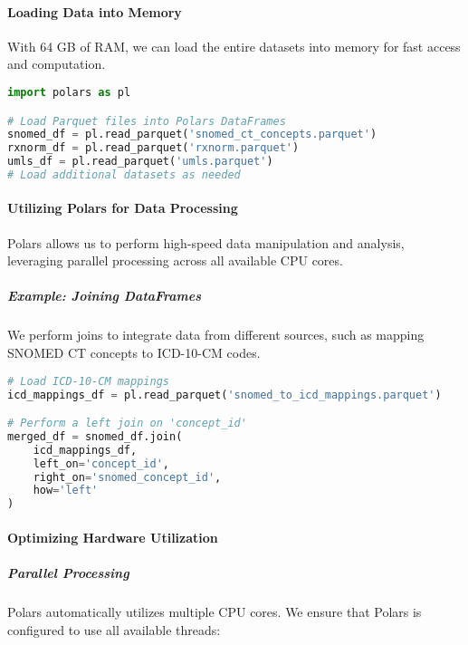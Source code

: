 \documentclass[12pt, a4paper]{article}
\begin{document}
\paragraph{Loading Data into Memory}

With 64 GB of RAM, we can load the entire datasets into memory for fast access and computation.

\begin{lstlisting}[language=Python, caption=Loading Parquet files into Polars DataFrames, label=lst:load_parquet]
import polars as pl

# Load Parquet files into Polars DataFrames
snomed_df = pl.read_parquet('snomed_ct_concepts.parquet')
rxnorm_df = pl.read_parquet('rxnorm.parquet')
umls_df = pl.read_parquet('umls.parquet')
# Load additional datasets as needed
\end{lstlisting}

\paragraph{Utilizing Polars for Data Processing}

Polars allows us to perform high-speed data manipulation and analysis, leveraging parallel processing across all available CPU cores.

\subparagraph{Example: Joining DataFrames}

We perform joins to integrate data from different sources, such as mapping SNOMED CT concepts to ICD-10-CM codes.

\begin{lstlisting}[language=Python, caption=Joining SNOMED CT concepts with ICD-10-CM mappings, label=lst:join_dataframes]
# Load ICD-10-CM mappings
icd_mappings_df = pl.read_parquet('snomed_to_icd_mappings.parquet')

# Perform a left join on 'concept_id'
merged_df = snomed_df.join(
    icd_mappings_df,
    left_on='concept_id',
    right_on='snomed_concept_id',
    how='left'
)
\end{lstlisting}

\paragraph{Optimizing Hardware Utilization}

\subparagraph{Parallel Processing}

Polars automatically utilizes multiple CPU cores. We ensure that Polars is configured to use all available threads:
\end{document}
